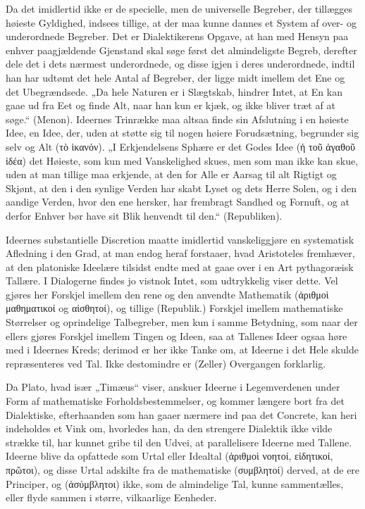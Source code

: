 \documentclass[12pt]{book}
\newcommand{\opage}[1]{\marginnote{\footnotesize\textit{[#1]}}}
\begin{document}
Da det imidlertid ikke er de specielle, men de universelle Begreber, der tillægges høieste
Gyldighed, indsees tillige, at der maa kunne dannes et System af over- og underordnede Begreber.
Det er Dialektikerens Opgave, at han med Hensyn paa enhver paagjældende Gjenstand skal søge først
det almindeligste Begreb, derefter dele det i dets nærmest underordnede, og disse igjen i deres
underordnede, indtil han har udtømt det hele Antal af Begreber, der ligge midt imellem det Ene og
det Ubegrændsede. „Da hele Naturen er i Slægtskab, hindrer Intet, at En kan gaae ud fra Eet og
finde Alt, naar han kun er kjæk, og ikke bliver træt af at søge.“ (Menon). Ideernes Trinrække maa
altsaa finde sin Afslutning i en høieste Idee, en Idee, der, uden at støtte sig til nogen høiere
Forudsætning, begrunder sig selv og Alt (τὸ ἱκανόν). „I Erkjendelsens Sphære er det Godes Idee (ἡ
τοῦ ἀγαθοῦ ἰδέα) det Høieste, som kun med Vanskelighed skues, men som man ikke kan skue, uden at
man tillige maa erkjende, at den for Alle er Aarsag til alt Rigtigt og Skjønt, at den i den
synlige Verden har skabt Lyset og dets Herre Solen, og i den aandige Verden, hvor den ene hersker,
har frembragt Sandhed og Fornuft, og at derfor Enhver bør have sit Blik henvendt til den.“
(Republiken).

Ideernes substantielle Discretion maatte imidlertid vanskeliggjøre en systematisk Afledning i den
Grad, at man endog heraf forstaaer, hvad Aristoteles fremhæver, at den platoniske Ideelære
tilsidst endte med at gaae over i en Art pythagoræisk Tallære. I Dialogerne findes jo vistnok
Intet, som udtrykkelig viser dette. Vel gjøres her Forskjel imellem den rene og den anvendte
Mathematik (ἀριθμοὶ
\opage{136} μαθηματικοί og αἰσθητοί), og tillige (Republik.) Forskjel imellem mathematiske Størrelser og
oprindelige Talbegreber, men kun i samme Betydning, som naar der ellers gjøres Forskjel imellem
Tingen og Ideen, saa at Tallenes Ideer ogsaa høre med i Ideernes Kreds; derimod er her ikke Tanke
om, at Ideerne i det Hele skulde repræsenteres ved Tal. Ikke destomindre er (Zeller) Overgangen
forklarlig.

Da Plato, hvad især „Timæus“ viser, anskuer Ideerne i Legemverdenen under Form af mathematiske
Forholdsbestemmelser, og kommer længere bort fra det Dialektiske, efterhaanden som han gaaer
nærmere ind paa det Concrete, kan heri indeholdes et Vink om, hvorledes han, da den strengere
Dialektik ikke vilde strække til, har kunnet gribe til den Udvei, at parallelisere Ideerne med
Tallene. Ideerne blive da opfattede som Urtal eller Idealtal (ἀριθμοὶ νοητοί, εἰδητικοί, πρῶτοι),
og disse Urtal adskilte fra de mathematiske (συμβλητοί) derved, at de ere Principer, og
(ἀσύμβλητοι) ikke, som de almindelige Tal, kunne sammentælles, eller flyde sammen i større,
vilkaarlige Eenheder.
\end{document}
